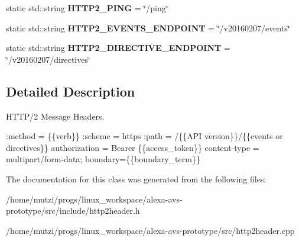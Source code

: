 \begin{DoxyCompactItemize}
static std\+::string {\bfseries H\+T\+T\+P2\+\_\+\+P\+I\+NG} = \char`\"{}/ping\char`\"{}
\item 
\mbox{\label{classNetwork_1_1HTTP_1_1HTTP2Header_a3c8bbf85c2e90b27d281928c24aba2fe}} 
static std\+::string {\bfseries H\+T\+T\+P2\+\_\+\+E\+V\+E\+N\+T\+S\+\_\+\+E\+N\+D\+P\+O\+I\+NT} = \char`\"{}/v20160207/events\char`\"{}
\item 
\mbox{\label{classNetwork_1_1HTTP_1_1HTTP2Header_ad0374b2131663d3fa3c3329d62af0e93}} 
static std\+::string {\bfseries H\+T\+T\+P2\+\_\+\+D\+I\+R\+E\+C\+T\+I\+V\+E\+\_\+\+E\+N\+D\+P\+O\+I\+NT} = \char`\"{}/v20160207/directives\char`\"{}
\end{DoxyCompactItemize}


\subsection{Detailed Description}
H\+T\+T\+P/2 Message Headers. 

\+:method = \{\{verb\}\} \+:scheme = https \+:path = /\{\{A\+PI version\}\}/\{\{events or directives\}\} authorization = Bearer \{\{access\+\_\+token\}\} content-\/type = multipart/form-\/data; boundary=\{\{boundary\+\_\+term\}\} 

The documentation for this class was generated from the following files\+:\begin{DoxyCompactItemize}
\item 
/home/mutzi/progs/linux\+\_\+workspace/alexa-\/avs-\/prototype/src/include/http2header.\+h\item 
/home/mutzi/progs/linux\+\_\+workspace/alexa-\/avs-\/prototype/src/http2header.\+cpp\end{DoxyCompactItemize}

